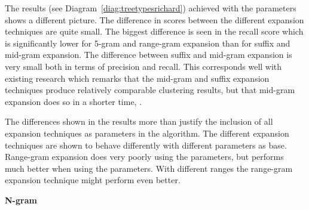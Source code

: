 
The results (see Diagram~\ref{diag:treetypesrichard}) achieved with the \citeauthor{Moe2013compact} parameters shows a different picture. The difference in scores between the different expansion techniques are quite small. The biggest difference is seen in the recall score which is significantly lower for 5-gram and range-gram expansion than for suffix and mid-gram expansion. The difference between suffix and mid-gram expansion is very small both in terms of precision and recall. This corresponds well with existing research which remarks that the mid-gram and suffix expansion techniques produce relatively comparable clustering results, but that mid-gram expansion does so in a shorter time, \parencite{Moe2013compact}.

The differences shown in the results more than justify the inclusion of all expansion techniques as parameters in the algorithm. The different expansion techniques are shown to behave differently with different parameters as base. Range-gram expansion does very poorly using the \citeauthor{Oren1998} parameters, but performs much better when using the \citeauthor{Moe2013compact} parameters. With different ranges the range-gram expansion technique might perform even better.

\textbf{N-gram}

